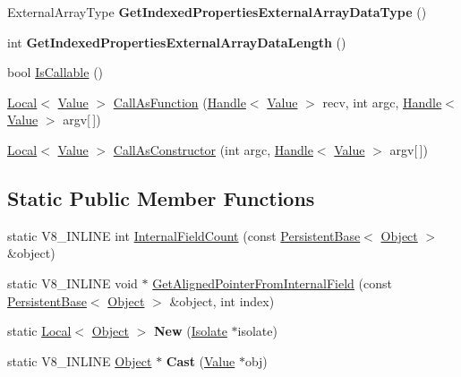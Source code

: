 \begin{DoxyCompactItemize}
\item 
\hypertarget{classv8_1_1_object_a02e0652188d3a9c557b07ac2ba037b23}{}External\+Array\+Type {\bfseries Get\+Indexed\+Properties\+External\+Array\+Data\+Type} ()\label{classv8_1_1_object_a02e0652188d3a9c557b07ac2ba037b23}

\item 
\hypertarget{classv8_1_1_object_a9aa725628f4d3371999663e6611efeb3}{}int {\bfseries Get\+Indexed\+Properties\+External\+Array\+Data\+Length} ()\label{classv8_1_1_object_a9aa725628f4d3371999663e6611efeb3}

\item 
bool \hyperlink{classv8_1_1_object_a23c2c1f23b50fab4a02e2f819641b865}{Is\+Callable} ()
\item 
\hyperlink{classv8_1_1_local}{Local}$<$ \hyperlink{classv8_1_1_value}{Value} $>$ \hyperlink{classv8_1_1_object_ac8dea845a715de7ad43fcb073dc8c3d9}{Call\+As\+Function} (\hyperlink{classv8_1_1_handle}{Handle}$<$ \hyperlink{classv8_1_1_value}{Value} $>$ recv, int argc, \hyperlink{classv8_1_1_handle}{Handle}$<$ \hyperlink{classv8_1_1_value}{Value} $>$ argv\mbox{[}$\,$\mbox{]})
\item 
\hyperlink{classv8_1_1_local}{Local}$<$ \hyperlink{classv8_1_1_value}{Value} $>$ \hyperlink{classv8_1_1_object_afeb999e9225dad0ca8605ed3015b268b}{Call\+As\+Constructor} (int argc, \hyperlink{classv8_1_1_handle}{Handle}$<$ \hyperlink{classv8_1_1_value}{Value} $>$ argv\mbox{[}$\,$\mbox{]})
\end{DoxyCompactItemize}
\subsection*{Static Public Member Functions}
\begin{DoxyCompactItemize}
\item 
static V8\+\_\+\+I\+N\+L\+I\+N\+E int \hyperlink{classv8_1_1_object_a324a71142f621a32bfe5738648718370}{Internal\+Field\+Count} (const \hyperlink{classv8_1_1_persistent_base}{Persistent\+Base}$<$ \hyperlink{classv8_1_1_object}{Object} $>$ \&object)
\item 
static V8\+\_\+\+I\+N\+L\+I\+N\+E void $\ast$ \hyperlink{classv8_1_1_object_a65b5a3dc93c0774594f8b0f2ab5481c8}{Get\+Aligned\+Pointer\+From\+Internal\+Field} (const \hyperlink{classv8_1_1_persistent_base}{Persistent\+Base}$<$ \hyperlink{classv8_1_1_object}{Object} $>$ \&object, int index)
\item 
\hypertarget{classv8_1_1_object_a0c397b055e2f5050c6ffc33970669c4d}{}static \hyperlink{classv8_1_1_local}{Local}$<$ \hyperlink{classv8_1_1_object}{Object} $>$ {\bfseries New} (\hyperlink{classv8_1_1_isolate}{Isolate} $\ast$isolate)\label{classv8_1_1_object_a0c397b055e2f5050c6ffc33970669c4d}

\item 
\hypertarget{classv8_1_1_object_a1f9ac46d0b164197318ce81dc0ec1343}{}static V8\+\_\+\+I\+N\+L\+I\+N\+E \hyperlink{classv8_1_1_object}{Object} $\ast$ {\bfseries Cast} (\hyperlink{classv8_1_1_value}{Value} $\ast$obj)\label{classv8_1_1_object_a1f9ac46d0b164197318ce81dc0ec1343}

\end{DoxyCompactItemize}


